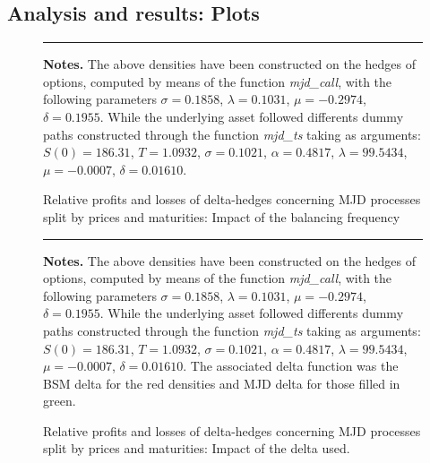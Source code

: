 \documentclass[12pt]{report}
\begin{document}
\begin{appendices}
\chapter{Analysis and results: Plots}
\label{cha:appendanalysis:plot}



\begin{figure}[h]
  \centering
  \rule{40mm}{20mm}
  \caption{Relative profits and losses of delta-hedges concerning MJD processes split by prices and maturities: Impact of the balancing frequency}
  \begin{changemargin}{0.5cm}{0.5cm}
  \medskip
\footnotesize
{}\textbf{Notes.} The above densities have been constructed on the hedges of options, computed by means of the function \textit{mjd\_call}, with the following parameters $\sigma = 0.1858$, $\lambda = 0.1031$, $\mu = -0.2974$, $\delta = 0.1955$. While the underlying asset followed differents dummy paths constructed through the function \textit{mjd\_ts} taking as arguments: $S(0) = 186.31$, $T = 1.0932$, $\sigma = 0.1021$, $\alpha = 0.4817$, $\lambda = 99.5434$, $\mu = -0.0007$, $\delta = 0.01610$. 
  \end{changemargin}
  \label{p:analysis:mjd:pl:dist:big}
\end{figure}




\begin{figure}[h]
  \centering
  \rule{40mm}{20mm}
  \caption{Relative profits and losses of delta-hedges concerning MJD processes split by prices and maturities: Impact of the delta used.}
  \begin{changemargin}{0.5cm}{0.5cm}
  \medskip
\footnotesize
{}\textbf{Notes.} The above densities have been constructed on the hedges of options, computed by means of the function \textit{mjd\_call}, with the following parameters $\sigma = 0.1858$, $\lambda = 0.1031$, $\mu = -0.2974$, $\delta = 0.1955$. While the underlying asset followed differents dummy paths constructed through the function \textit{mjd\_ts} taking as arguments: $S(0) = 186.31$, $T = 1.0932$, $\sigma = 0.1021$, $\alpha = 0.4817$, $\lambda = 99.5434$, $\mu = -0.0007$, $\delta = 0.01610$. The associated delta function was the BSM delta for the red densities and MJD delta for those filled in green.
  \end{changemargin}
  \label{p:analysis:mjd:pl:dist:deltas}
\end{figure}



\end{appendices}
\end{document}
